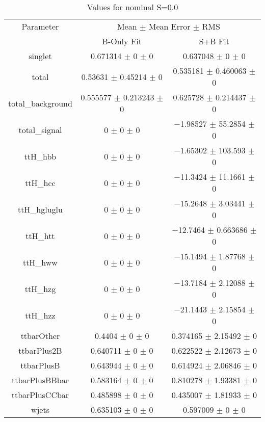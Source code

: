 \begin{table}
\centering
\caption{Values for nominal S=0.0}
\begin{tabular}{ccc}
\toprule
Parameter & \multicolumn{2}{c}{Mean $\pm$ Mean Error $\pm$ RMS}\\
 & B-Only Fit & S+B Fit\\
\midrule
singlet & \num{0.671314} $\pm$ \num{0} $\pm$ \num{0} & \num{0.637048} $\pm$ \num{0} $\pm$ \num{0}\\
total & \num{0.53631} $\pm$ \num{0.45214} $\pm$ \num{0} & \num{0.535181} $\pm$ \num{0.460063} $\pm$ \num{0}\\
total\_background & \num{0.555577} $\pm$ \num{0.213243} $\pm$ \num{0} & \num{0.625728} $\pm$ \num{0.214437} $\pm$ \num{0}\\
total\_signal & \num{0} $\pm$ \num{0} $\pm$ \num{0} & \num{-1.98527} $\pm$ \num{55.2854} $\pm$ \num{0}\\
ttH\_hbb & \num{0} $\pm$ \num{0} $\pm$ \num{0} & \num{-1.65302} $\pm$ \num{103.593} $\pm$ \num{0}\\
ttH\_hcc & \num{0} $\pm$ \num{0} $\pm$ \num{0} & \num{-11.3424} $\pm$ \num{11.1661} $\pm$ \num{0}\\
ttH\_hgluglu & \num{0} $\pm$ \num{0} $\pm$ \num{0} & \num{-15.2648} $\pm$ \num{3.03441} $\pm$ \num{0}\\
ttH\_htt & \num{0} $\pm$ \num{0} $\pm$ \num{0} & \num{-12.7464} $\pm$ \num{0.663686} $\pm$ \num{0}\\
ttH\_hww & \num{0} $\pm$ \num{0} $\pm$ \num{0} & \num{-15.1494} $\pm$ \num{1.87768} $\pm$ \num{0}\\
ttH\_hzg & \num{0} $\pm$ \num{0} $\pm$ \num{0} & \num{-13.7184} $\pm$ \num{2.12088} $\pm$ \num{0}\\
ttH\_hzz & \num{0} $\pm$ \num{0} $\pm$ \num{0} & \num{-21.1443} $\pm$ \num{2.15854} $\pm$ \num{0}\\
ttbarOther & \num{0.4404} $\pm$ \num{0} $\pm$ \num{0} & \num{0.374165} $\pm$ \num{2.15492} $\pm$ \num{0}\\
ttbarPlus2B & \num{0.640711} $\pm$ \num{0} $\pm$ \num{0} & \num{0.622522} $\pm$ \num{2.12673} $\pm$ \num{0}\\
ttbarPlusB & \num{0.643944} $\pm$ \num{0} $\pm$ \num{0} & \num{0.614924} $\pm$ \num{2.06846} $\pm$ \num{0}\\
ttbarPlusBBbar & \num{0.583164} $\pm$ \num{0} $\pm$ \num{0} & \num{0.810278} $\pm$ \num{1.93381} $\pm$ \num{0}\\
ttbarPlusCCbar & \num{0.485898} $\pm$ \num{0} $\pm$ \num{0} & \num{0.435007} $\pm$ \num{1.81933} $\pm$ \num{0}\\
wjets & \num{0.635103} $\pm$ \num{0} $\pm$ \num{0} & \num{0.597009} $\pm$ \num{0} $\pm$ \num{0}\\
\bottomrule
\end{tabular}
\end{table}
